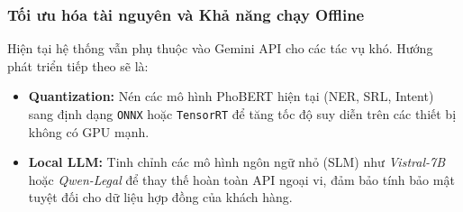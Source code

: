 \subsubsection{Tối ưu hóa tài nguyên và Khả năng chạy Offline}
Hiện tại hệ thống vẫn phụ thuộc vào Gemini API cho các tác vụ khó. Hướng phát triển tiếp theo sẽ là:
\begin{itemize}
    \item \textbf{Quantization:} Nén các mô hình PhoBERT hiện tại (NER, SRL, Intent) sang định dạng \texttt{ONNX} hoặc \texttt{TensorRT} để tăng tốc độ suy diễn trên các thiết bị không có GPU mạnh.
    \item \textbf{Local LLM:} Tinh chỉnh các mô hình ngôn ngữ nhỏ (SLM) như \textit{Vistral-7B} hoặc \textit{Qwen-Legal} để thay thế hoàn toàn API ngoại vi, đảm bảo tính bảo mật tuyệt đối cho dữ liệu hợp đồng của khách hàng.
\end{itemize}